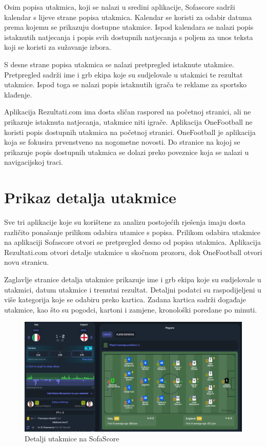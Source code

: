 \documentclass[times, utf8, zavrsni]{fer}
\begin{document}
Osim popisa utakmica, koji se nalazi u sredini aplikacije, Sofascore sadrži kalendar s lijeve strane popisa utakmica.
Kalendar se koristi za odabir datuma prema kojemu se prikazuju dostupne utakmice.
Ispod kalendara se nalazi popis istaknutih natjecanja i popis svih dostupnih natjecanja s poljem za unos teksta koji se koristi za sužavanje izbora.

S desne strane popisa utakmica se nalazi pretpregled istaknute utakmice. Pretpregled sadrži ime i grb ekipa koje su sudjelovale u utakmici te rezultat utakmice.
Ispod toga se nalazi popis istaknutih igrača te reklame za sportsko klađenje.

Aplikacija Rezultati.com ima dosta sličan raspored na početnoj stranici, ali ne prikazuje istaknuta natjecanja, utakmice niti igrače.
Aplikacija OneFootball ne koristi popis dostupnih utakmica na početnoj stranici. OneFootball je aplikacija koja se fokusira prvenstveno na nogometne novosti.
Do stranice na kojoj se prikazuje popis dostupnih utakmica se dolazi preko poveznice koja se nalazi u navigacijskoj traci.

\section{Prikaz detalja utakmice}

Sve tri aplikacije koje su korištene za analizu postojećih rješenja imaju dosta različito ponašanje prilikom odabira utamice s popisa.
Prilikom odabira utakmice na aplikaciji Sofascore otvori se pretpregled desno od popisa utakmica.
Aplikacija Rezultati.com otvori detalje utakmice u skočnom prozoru, dok OneFootball otvori novu stranicu.

Zaglavlje stranice detalja utakmice prikazuje ime i grb ekipa koje su sudjelovale u utakmici, datum utakmice i trenutni rezultat.
Detaljni podatci su raspodijeljeni u više kategorija koje se odabiru preko kartica. Zadana kartica sadrži događaje utakmice, kao što su pogodci, kartoni i zamjene, kronološki poredane po minuti.

\begin{figure}[htb]
\centering
\includegraphics[width=15cm]{images/ss-detail.jpg}
\caption{Detalji utakmice na SofaScore}
\label{fig:ss-detail}
\end{figure}
\end{document}
